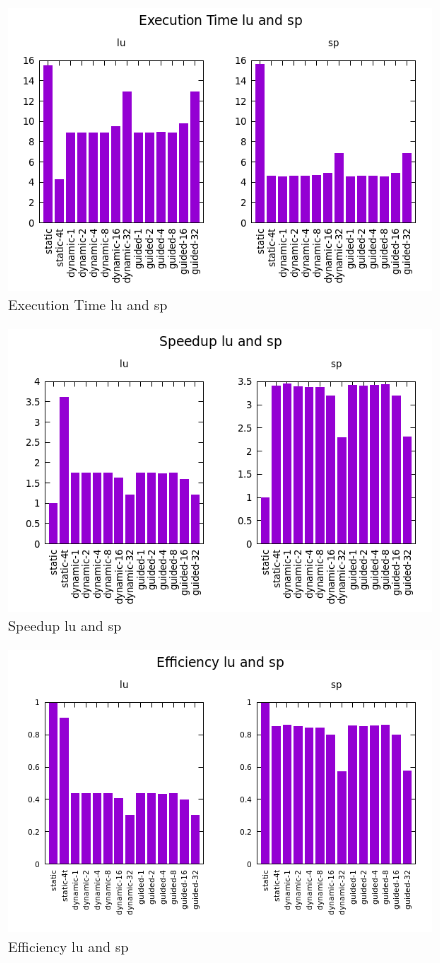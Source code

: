 \documentclass[12pt]{article}
\begin{document}
\begin{figure}[h!]
	\centering
	\includegraphics[width=0.8\linewidth]{scheduling_t.png}
	\caption{Execution Time lu and sp}
	\label{fig:t}
\end{figure}

\newpage

\begin{figure}[h!]
	\centering
	\includegraphics[width=0.8\linewidth]{scheduling_s.png}
	\caption{Speedup lu and sp}
	\label{fig:s}
\end{figure}

\begin{figure}[h!]
	\centering
	\includegraphics[width=0.8\linewidth]{scheduling_e.png}
	\caption{Efficiency lu and sp}
	\label{fig:e}
\end{figure}
\end{document}
